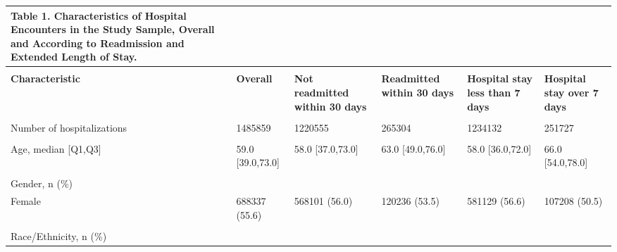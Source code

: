 \begin{adjustbox}{width={\textwidth},totalheight={\textheight},keepaspectratio,frame}%
\sffamily%
{%
\begin{tabular}{L{20em}C{10em}C{10em}C{10em}C{10em}C{10em}}
 
{{\textbf{\color{NEJMRed} Table 1.}}
\textbf{Characteristics  of Hospital Encounters in the Study Sample, Overall and According to Readmission and Extended Length of Stay.}}\\[10pt] %
\hline
&                 &                            &                        &                             &                        \\
\textbf{Characteristic}      &     \textbf{Overall} & \textbf{Not readmitted within 30 days} & \textbf{Readmitted within 30 days} & \textbf{Hospital stay less than 7 days} & \textbf{Hospital stay over 7 days} \\
&                 &                            &                        &                             &                        \\
Number of hospitalizations &            1485859 &                       1220555 &                    265304 &                        1234132 &                    251727 \\
&                 &                            &                        &                             &                        \\
Age, median [Q1,Q3] &   59.0 [39.0,73.0] &              58.0 [37.0,73.0] &          63.0 [49.0,76.0] &               58.0 [36.0,72.0] &          66.0 [54.0,78.0] \\
&                 &                            &                        &                             &                        \\
Gender, n (\%) &                 &                            &                        &                             &                        \\
\hspace{3mm} Female &      688337 (55.6) &                 568101 (56.0) &             120236 (53.5) &                  581129 (56.6) &             107208 (50.5) \\
&                 &                            &                        &                             &                        \\
Race/Ethnicity, n (\%) &                 &                            &                        &                             &                        \\

\end{tabular}}
\end{adjustbox}
